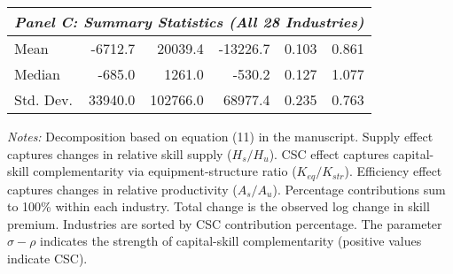 \begin{table}[htbp]
\begin{tabular}{lrrrrr}
\hline
\multicolumn{6}{l}{\textit{Panel C: Summary Statistics (All 28 Industries)}} \\ \hline
Mean & -6712.7 & 20039.4 & -13226.7 & 0.103 & 0.861 \\
Median & -685.0 & 1261.0 & -530.2 & 0.127 & 1.077 \\
Std. Dev. & 33940.0 & 102766.0 & 68977.4 & 0.235 & 0.763 \\
\hline\hline
\end{tabular}
\begin{flushleft}
\footnotesize \textit{Notes:} Decomposition based on equation (11) in the manuscript. Supply effect captures changes in relative skill supply ($H_s/H_u$). CSC effect captures capital-skill complementarity via equipment-structure ratio ($K_{eq}/K_{str}$). Efficiency effect captures changes in relative productivity ($A_s/A_u$). Percentage contributions sum to 100\% within each industry. Total change is the observed log change in skill premium. Industries are sorted by CSC contribution percentage. The parameter $\sigma - \rho$ indicates the strength of capital-skill complementarity (positive values indicate CSC).
\end{flushleft}
\end{table}
